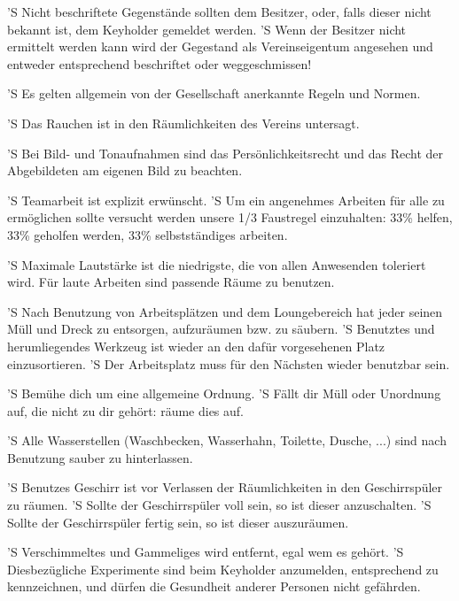 \documentclass[a4paper,10pt]{scrreprt}
\begin{document}
\begin{contract}
'S Nicht beschriftete Gegenstände sollten dem Besitzer, oder, falls dieser
nicht bekannt ist, dem Keyholder gemeldet werden.
'S Wenn der Besitzer nicht ermittelt werden kann wird der Gegestand als
Vereinseigentum angesehen und entweder entsprechend beschriftet oder
weggeschmissen!


'S Es gelten allgemein von der Gesellschaft anerkannte Regeln und Normen.

'S Das Rauchen ist in den Räumlichkeiten des Vereins untersagt.

'S Bei Bild- und Tonaufnahmen sind das Persönlichkeitsrecht und das Recht der
Abgebildeten am eigenen Bild zu beachten.

'S Teamarbeit ist explizit erwünscht.
'S Um ein angenehmes Arbeiten für alle zu ermöglichen sollte versucht werden
unsere 1/3 Faustregel einzuhalten: 33\% helfen, 33\% geholfen werden, 33\%
selbstständiges arbeiten.

'S Maximale Lautstärke ist die niedrigste, die von allen Anwesenden toleriert
wird. Für laute Arbeiten sind passende Räume zu benutzen.


'S Nach Benutzung von Arbeitsplätzen und dem Loungebereich hat jeder seinen
Müll und Dreck zu entsorgen, aufzuräumen bzw. zu säubern.
'S Benutztes und herumliegendes Werkzeug ist wieder an den dafür vorgesehenen
Platz einzusortieren.
'S Der Arbeitsplatz muss für den Nächsten wieder benutzbar sein.

'S Bemühe dich um eine allgemeine Ordnung.
'S Fällt dir Müll oder Unordnung auf, die nicht zu dir gehört: räume dies auf.

'S Alle Wasserstellen (Waschbecken, Wasserhahn, Toilette, Dusche, ...) sind
nach Benutzung sauber zu hinterlassen.

'S Benutzes Geschirr ist vor Verlassen der Räumlichkeiten in den
Geschirrspüler zu räumen.
'S Sollte der Geschirrspüler voll sein, so ist dieser anzuschalten.
'S Sollte der Geschirrspüler fertig sein, so ist dieser auszuräumen.

'S Verschimmeltes und Gammeliges wird entfernt, egal wem es gehört.
'S Diesbezügliche Experimente sind beim Keyholder anzumelden, entsprechend zu
kennzeichnen, und dürfen die Gesundheit anderer Personen nicht gefährden.

\end{contract}
\end{document}
